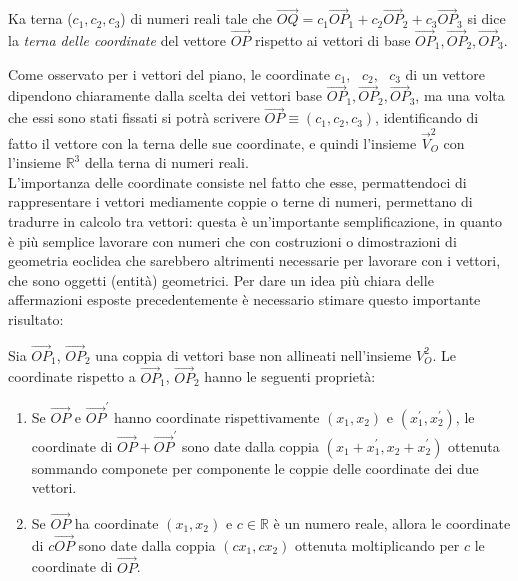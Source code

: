 \begin{defi}
  Ka terna ($c_1,c_2,c_3$) di numeri reali tale che $\vec{OQ}= c_1\vec{OP}_1+c_2\vec{OP}_2+c_3\vec{OP}_3$ si dice la \textit{terna delle coordinate} del vettore $\vec{OP}$ rispetto ai vettori di base $\vec{OP}_1,\vec{OP}_2, \vec{OP}_3$.
\end{defi}
Come osservato per i vettori del piano, le coordinate $c_1, \text{ } c_2, \text{ } c_3$ di un vettore dipendono chiaramente dalla scelta dei vettori base $\vec{OP}_1,\vec{OP}_2, \vec{OP}_3$, ma una volta che essi sono stati fissati si potrà scrivere $\vec{OP}\equiv (c_1,c_2,c_3)$, identificando di fatto il vettore con la terna delle sue coordinate, e quindi l'insieme $\vec{V}_O^2$ con l'insieme $\mathds{R}^3$ della terna di numeri reali.\\
L'importanza delle coordinate consiste nel fatto che esse, permattendoci di rappresentare i vettori mediamente coppie o terne di numeri, permettano di tradurre in calcolo tra vettori: questa è un'importante semplificazione, in quanto è più semplice lavorare con numeri che con costruzioni o dimostrazioni di geometria eoclidea che sarebbero altrimenti necessarie per lavorare con i vettori, che sono oggetti (entità) geometrici. Per dare un idea più chiara delle affermazioni esposte precedentemente è necessario stimare questo importante risultato:
\begin{prop}
  \label{prop:coordinate1}
  Sia $\vec{OP}_1$, $\vec{OP}_2$ una coppia di vettori base non allineati nell'insieme $V_O^2$. Le coordinate rispetto a $\vec{OP}_1$, $\vec{OP}_2$ hanno le seguenti proprietà:
  \begin{enumerate}
  \item Se $\vec{OP}$ e $\vec{OP}^\prime$ hanno coordinate rispettivamente $(x_1,x_2)$ e $(x^\prime_1,x^\prime_2)$, le coordinate di $\vec{OP}+\vec{OP}^\prime$ sono date dalla coppia $(x_1+x^\prime_1,x_2+x^\prime_2)$ ottenuta sommando componete per componente le coppie delle coordinate dei due vettori.
  \item Se $\vec{OP}$ ha coordinate $(x_1,x_2)$ e $c\in \mathds{R}$ è un numero reale, allora le coordinate di $c\vec{OP}$ sono date dalla coppia $(cx_1,cx_2)$ ottenuta moltiplicando per $c$ le coordinate di $\vec{OP}$.
  \end{enumerate}
\end{prop}
